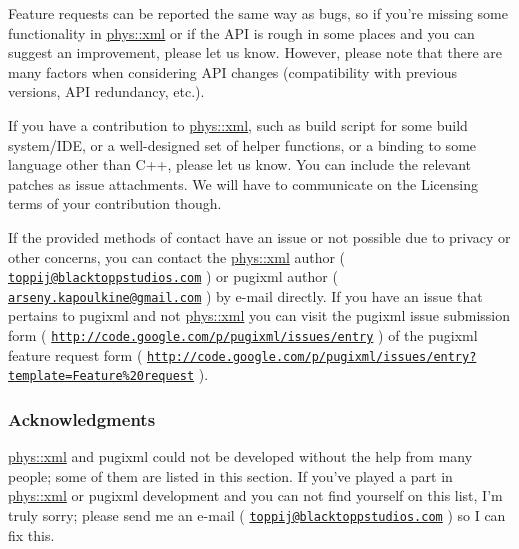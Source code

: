  \par
 Feature requests can be reported the same way as bugs, so if you're missing some functionality in \hyperlink{namespacephys_1_1xml}{phys::xml} or if the API is rough in some places and you can suggest an improvement, please let us know. However, please note that there are many factors when considering API changes (compatibility with previous versions, API redundancy, etc.). \par
 \par
 If you have a contribution to \hyperlink{namespacephys_1_1xml}{phys::xml}, such as build script for some build system/IDE, or a well-\/designed set of helper functions, or a binding to some language other than C++, please let us know. You can include the relevant patches as issue attachments. We will have to communicate on the Licensing terms of your contribution though. \par
 \par
 If the provided methods of contact have an issue or not possible due to privacy or other concerns, you can contact the \hyperlink{namespacephys_1_1xml}{phys::xml} author ( \href{mailto:toppij@blacktoppstudios.com}{\tt toppij@blacktoppstudios.com} ) or pugixml author ( \href{mailto:arseny.kapoulkine@gmail.com}{\tt arseny.kapoulkine@gmail.com} ) by e-\/mail directly. If you have an issue that pertains to pugixml and not \hyperlink{namespacephys_1_1xml}{phys::xml} you can visit the pugixml issue submission form ( \href{http://code.google.com/p/pugixml/issues/entry}{\tt http://code.google.com/p/pugixml/issues/entry} ) of the pugixml feature request form ( \href{http://code.google.com/p/pugixml/issues/entry?template=Feature%20request}{\tt http://code.google.com/p/pugixml/issues/entry?template=Feature\%20request} ). \par
 \par
 \hypertarget{XMLManual_XMLAcknowledgments}{}\subsubsection{Acknowledgments}\label{XMLManual_XMLAcknowledgments}
\hyperlink{namespacephys_1_1xml}{phys::xml} and pugixml could not be developed without the help from many people; some of them are listed in this section. If you've played a part in \hyperlink{namespacephys_1_1xml}{phys::xml} or pugixml development and you can not find yourself on this list, I'm truly sorry; please send me an e-\/mail ( \href{mailto:toppij@blacktoppstudios.com}{\tt toppij@blacktoppstudios.com} ) so I can fix this. \par
